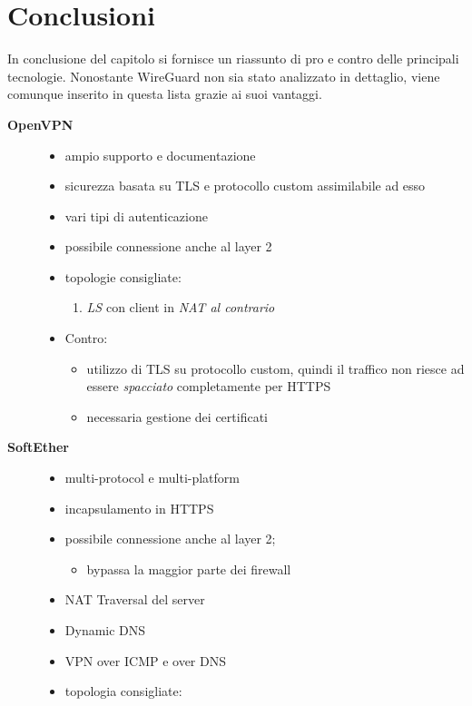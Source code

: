 \section{Conclusioni}
In conclusione del capitolo si fornisce un riassunto di pro e contro delle principali
tecnologie.
Nonostante WireGuard non sia stato analizzato
in dettaglio, viene comunque inserito in questa lista grazie ai suoi vantaggi.
\begin{description}
  \item[\textbf{OpenVPN}]
  \begin{itemize}
    \item ampio supporto e documentazione
    \item sicurezza basata su TLS e protocollo custom assimilabile ad esso
    \item vari tipi di autenticazione
    \item possibile connessione anche al layer 2
    \item topologie consigliate:
    \begin{enumerate}
      \item \textit{LS} con client in \textit{NAT al contrario}
    \end{enumerate}
    \item Contro:
    \begin{itemize}
      \item utilizzo di TLS su protocollo custom, quindi il traffico non riesce
      ad essere \textit{spacciato} completamente per HTTPS
      \item necessaria gestione dei certificati
    \end{itemize}
  \end{itemize}
    \item[\textbf{SoftEther}]
    \begin{itemize}
      \item multi-protocol e multi-platform
      \item incapsulamento in HTTPS
      \item possibile connessione anche al layer 2;
      \begin{itemize}
        \item bypassa la maggior parte dei firewall
      \end{itemize}
      \item NAT Traversal del server
      \item Dynamic DNS
      \item VPN over ICMP e over DNS
      \item topologia consigliate:

\end{itemize}
\end{description}
